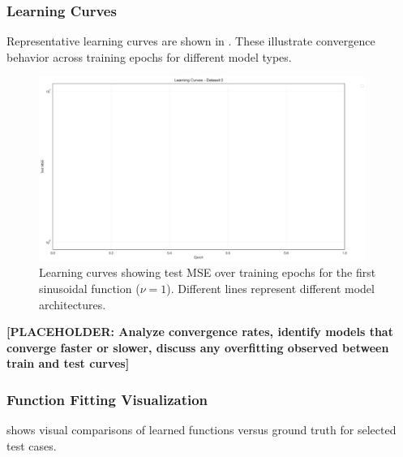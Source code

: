 \documentclass[11pt,a4paper]{article}
\begin{document}
\subsubsection{Learning Curves}

Representative learning curves are shown in . These illustrate convergence behavior across training epochs for different model types.

\begin{figure}[htbp]
\centering
\includegraphics[width=0.95\textwidth]{../section1/analysis/section1_complete_analysis_20251021_143055/section1_1_analysis/01_comparative_metrics/dataset_0_learning_curves_test.png}
\caption{Learning curves showing test MSE over training epochs for the first sinusoidal function ($\nu=1$). Different lines represent different model architectures.}
\label{fig:s11_learning}
\end{figure}

\textbf{[PLACEHOLDER: Analyze convergence rates, identify models that converge faster or slower, discuss any overfitting observed between train and test curves]}

\subsubsection{Function Fitting Visualization}

 shows visual comparisons of learned functions versus ground truth for selected test cases.
\end{document}
